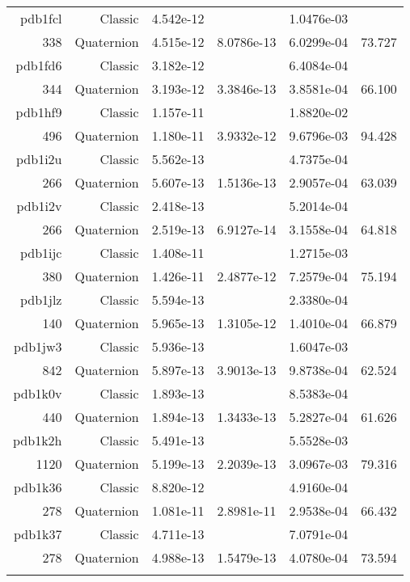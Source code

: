 \begin{xltabular}{\textwidth}{r|rS[table-format=1.3e+2]S[table-format=1.4e+2]S[table-format=1.4e+2]S[table-format=-1.3]}
pdb1fcl & Classic & 4.542e-12 &  & 1.0476e-03 & \\
338 & Quaternion & 4.515e-12 & 8.0786e-13 & 6.0299e-04 & 73.727\\  \addlinespace
pdb1fd6 & Classic & 3.182e-12 &  & 6.4084e-04 & \\
344 & Quaternion & 3.193e-12 & 3.3846e-13 & 3.8581e-04 & 66.100\\  \addlinespace
pdb1hf9 & Classic & 1.157e-11 &  & 1.8820e-02 & \\
496 & Quaternion & 1.180e-11 & 3.9332e-12 & 9.6796e-03 & 94.428\\  \addlinespace
pdb1i2u & Classic & 5.562e-13 &  & 4.7375e-04 & \\
266 & Quaternion & 5.607e-13 & 1.5136e-13 & 2.9057e-04 & 63.039\\  \addlinespace
pdb1i2v & Classic & 2.418e-13 &  & 5.2014e-04 & \\
266 & Quaternion & 2.519e-13 & 6.9127e-14 & 3.1558e-04 & 64.818\\  \addlinespace
pdb1ijc & Classic & 1.408e-11 &  & 1.2715e-03 & \\
380 & Quaternion & 1.426e-11 & 2.4877e-12 & 7.2579e-04 & 75.194\\  \addlinespace
pdb1jlz & Classic & 5.594e-13 &  & 2.3380e-04 & \\
140 & Quaternion & 5.965e-13 & 1.3105e-12 & 1.4010e-04 & 66.879\\  \addlinespace
pdb1jw3 & Classic & 5.936e-13 &  & 1.6047e-03 & \\
842 & Quaternion & 5.897e-13 & 3.9013e-13 & 9.8738e-04 & 62.524\\  \addlinespace
pdb1k0v & Classic & 1.893e-13 &  & 8.5383e-04 & \\
440 & Quaternion & 1.894e-13 & 1.3433e-13 & 5.2827e-04 & 61.626\\  \addlinespace
pdb1k2h & Classic & 5.491e-13 &  & 5.5528e-03 & \\
1120 & Quaternion & 5.199e-13 & 2.2039e-13 & 3.0967e-03 & 79.316\\  \addlinespace
pdb1k36 & Classic & 8.820e-12 &  & 4.9160e-04 & \\
278 & Quaternion & 1.081e-11 & 2.8981e-11 & 2.9538e-04 & 66.432\\  \addlinespace
pdb1k37 & Classic & 4.711e-13 &  & 7.0791e-04 & \\
278 & Quaternion & 4.988e-13 & 1.5479e-13 & 4.0780e-04 & 73.594\\  \addlinespace

\end{xltabular}

